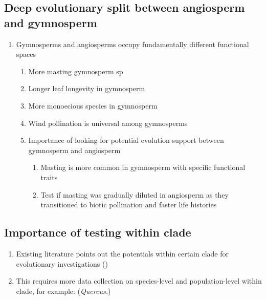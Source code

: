 \documentclass{article}
\begin{document}
\subsection{Deep evolutionary split between angiosperm and gymnosperm} %
\begin{enumerate}
\item Gymnosperms and angiosperms occupy fundamentally different functional spaces
\begin{enumerate}
\item More masting gymnosperm sp
\item Longer leaf longevity in gymnosperm
\item More monoecious species in gymnosperm
\item Wind pollination is universal among gymnosperms
\item Importance of looking for potential evolution support between gymnosperm and angiosperm
\begin{enumerate}
\item Masting is more common in gymnosperm with specific functional traits
\item Test if masting was gradually diluted in angiosperm as they transitioned to biotic pollination and faster life histories
\end{enumerate}
\end{enumerate}
\end{enumerate}

\subsection{Importance of testing within clade}
\begin{enumerate}
\item Existing literature points out the potentials within certain clade for evolutionary investigations (\cite{satake2021studying})
\item This requires more data collection on species-level and population-level within clade, for example: (\textit{Quercus.})
\end{enumerate}

 
\end{document}
